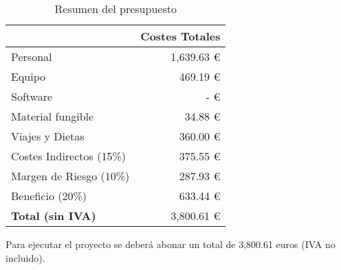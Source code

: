 \begin{table}[H]
	\centering
	\caption{Resumen del presupuesto}
	\label{tab:presupuesto_total}
	\begin{tabular}{|l|r|}
		\hline
		\rowcolor[HTML]{BFBFBF}
		\multicolumn{1}{|c|}{\cellcolor[HTML]{BFBFBF}\textbf{Presupuestos}} & \multicolumn{1}{c|}{\cellcolor[HTML]{BFBFBF}\textbf{Costes Totales}} \\ \hline
		Personal                                                            & 1,639.63 €                                                           \\ \hline
		Equipo                                                              & 469.19 €                                                             \\ \hline
		Software                                                            & - €                                                                  \\ \hline
		Material fungible                                                   & 34.88 €                                                              \\ \hline
		Viajes y Dietas                                                     & 360.00 €                                                             \\ \hline
		Costes Indirectos (15\%)                                            & 375.55 €                                                             \\ \hline
		Margen de Riesgo (10\%)                                             & 287.93 €                                                             \\ \hline
		Beneficio (20\%)                                                    & 633.44 €                                                             \\ \hline
		\textbf{Total (sin IVA)}                                            & 3,800.61 €                                                           \\ \hline
	\end{tabular}
\end{table}

\noindent
Para ejecutar el proyecto se deberá abonar un total de 3,800.61 euros (IVA no incluido).
